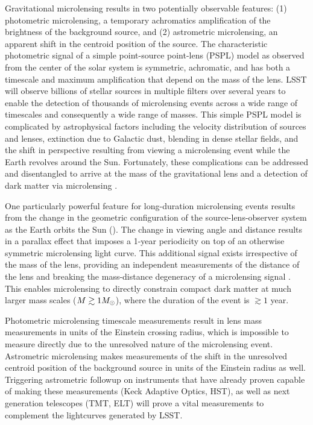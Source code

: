 Gravitational microlensing results in two potentially observable features: (1) photometric microlensing, a temporary achromatics amplification of the brightness of the background source, and (2) astrometric microlensing, an apparent shift in the centroid position of the source.
The characteristic photometric signal of a simple point-source point-lens (PSPL) model as observed from the center of the solar system is symmetric, achromatic, and has both a timescale and maximum amplification that depend on the mass of the lens.
LSST will observe billions of stellar sources in multiple filters over several years to enable the detection of thousands of microlensing events across a wide range of timescales and consequently a wide range of masses.
This simple PSPL model is complicated by astrophysical factors including the velocity distribution of sources and lenses, extinction due to Galactic dust, blending in dense stellar fields, and the shift in perspective resulting from viewing a microlensing event while the Earth revolves around the Sun.
Fortunately, these complications can be addressed and disentangled to arrive at the mass of the gravitational lens and a detection of dark matter via microlensing \citep{1405.3134,1509.04899}.

One particularly powerful feature for long-duration microlensing events results from the change in the geometric configuration of the source-lens-observer system as the Earth orbits the Sun ().
The change in viewing angle and distance results in a parallax effect that imposes a 1-year periodicity on top of an otherwise symmetric microlensing light curve.
This additional signal exists irrespective of the mass of the lens, providing an independent measurements of the distance of the lens and breaking the mass-distance degeneracy of a microlensing signal \citep[\eg][]{1509.04899}.
This enables microlensing to directly constrain compact dark matter at much larger mass scales ($M \gtrsim 1M_\odot$), where the duration of the event is $\gtrsim 1$ year.   

Photometric microlensing timescale measurements result in lens mass measurements in units of the Einstein crossing radius, which is impossible to measure directly due to the unresolved nature of the microlensing event.
Astrometric microlensing makes measurements of the shift in the unresolved centroid position of the background source in units of the Einstein radius as well.
Triggering astrometric followup on instruments that have already proven capable of making these measurements (Keck Adaptive Optics, HST), as well as next generation telescopes (TMT, ELT) will prove a vital measurements to complement the lightcurves generated by LSST.

